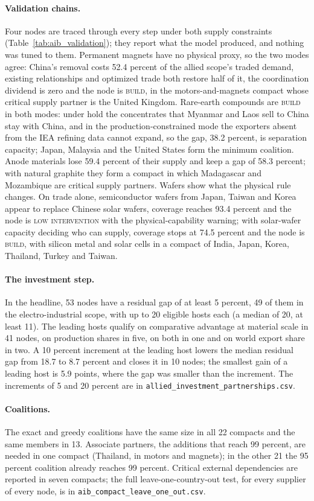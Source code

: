 \paragraph{Validation chains.} Four nodes are traced through every step under both supply constraints
(Table~\ref{tab:aib_validation}); they report what the model produced, and nothing was tuned to them.
Permanent magnets have no physical proxy, so the two modes agree: China's removal costs 52.4 percent of
the allied scope's traded demand, existing relationships and optimized trade both restore half of it,
the coordination dividend is zero and the node is \textsc{build}, in the motors-and-magnets compact
whose critical supply partner is the United Kingdom. Rare-earth compounds are \textsc{build} in both
modes: under hold the concentrates that Myanmar and Laos sell to China stay with China, and in the
production-constrained mode the exporters absent from the IEA refining data cannot expand, so the gap,
38.2 percent, is separation capacity; Japan, Malaysia and the United States form the minimum coalition.
Anode materials lose 59.4 percent of their supply and keep a gap of 58.3 percent; with natural graphite
they form a compact in which Madagascar and Mozambique are critical supply partners. Wafers show what the
physical rule changes. On trade alone, semiconductor wafers from Japan, Taiwan and Korea appear to
replace Chinese solar wafers, coverage reaches 93.4 percent and the node is \textsc{low intervention}
with the physical-capability warning; with solar-wafer capacity deciding who can supply, coverage stops at
74.5 percent and the node is \textsc{build}, with silicon metal and solar cells in a compact of India,
Japan, Korea, Thailand, Turkey and Taiwan.



\paragraph{The investment step.} In the headline, 53 nodes have a residual gap of at least 5 percent,
49 of them in the electro-industrial scope, with up to 20 eligible hosts each (a median of 20, at least
11). The leading hosts qualify on comparative advantage at material scale in 41 nodes, on production
shares in five, on both in one and on world export share in two. A 10 percent increment at the leading
host lowers the median residual gap from 18.7 to 8.7 percent and closes it in 10 nodes; the smallest gain
of a leading host is 5.9 points, where the gap was smaller than the increment. The increments of 5 and 20
percent are in \texttt{allied\_investment\_partnerships.csv}.

\paragraph{Coalitions.} The exact and greedy coalitions have the same size in all 22 compacts and the
same members in 13. Associate partners, the additions that reach 99 percent,
are needed in one compact (Thailand, in motors and magnets); in the other 21 the 95 percent coalition
already reaches 99 percent. Critical external dependencies are reported in seven compacts; the full
leave-one-country-out test, for every supplier of every node, is in
\texttt{aib\_compact\_leave\_one\_out.csv}.
